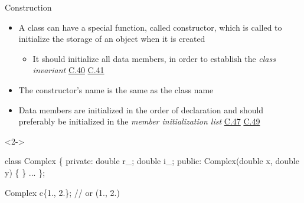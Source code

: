 \begin{frame}[fragile]{Construction}

  \begin{itemize}
  \item A class can have a special function, called \alert{constructor}, which
    is called to initialize the storage of an object when it is created
    \begin{itemize}
    \item It should initialize all data members, in order to establish the
      \textit{class invariant}
      \href{https://isocpp.github.io/CppCoreGuidelines/CppCoreGuidelines#c40-define-a-constructor-if-a-class-has-an-invariant}{C.40}
      \href{https://isocpp.github.io/CppCoreGuidelines/CppCoreGuidelines#c40-define-a-constructor-if-a-class-has-an-invariant}{C.41}
    \end{itemize}
  \item The constructor's name is the same as the class name
  \item<3-> Data members are initialized in the order of declaration and
    should preferably be initialized in the \textit{member initialization list}
    \href{https://isocpp.github.io/CppCoreGuidelines/CppCoreGuidelines#c47-define-and-initialize-member-variables-in-the-order-of-member-declaration}{C.47}
    \href{https://isocpp.github.io/CppCoreGuidelines/CppCoreGuidelines#c49-prefer-initialization-to-assignment-in-constructors}{C.49}
  \end{itemize}

  \begin{codeblock}<2->{
class \alert<2>{Complex} \{
 private:
  double r_;
  double i_;
 public:
  \alert<2>{Complex}(double x, double y)
  \{  \}
  ...
\};

Complex c\{1., 2.\}; // or (1., 2.)}\end{codeblock}

\end{frame}


